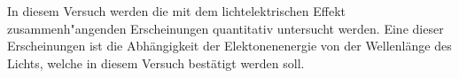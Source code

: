 %
%
In diesem Versuch werden die mit dem lichtelektrischen Effekt zusammenh"angenden Erscheinungen
quantitativ untersucht werden. Eine dieser Erscheinungen ist die Abhängigkeit der
Elektonenenergie von der Wellenlänge des Lichts, welche in diesem Versuch bestätigt werden
soll.